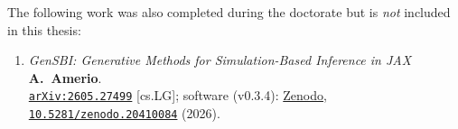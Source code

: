 \noindent The following work was also completed during the doctorate but is
\emph{not} included in this thesis:
%
\begin{enumerate}[resume]
	\item \emph{GenSBI: Generative Methods for Simulation-Based Inference in JAX}\\
	      \textbf{A.~Amerio}.\\
	      \href{https://arxiv.org/abs/2605.27499}{\tt arXiv:2605.27499} [cs.LG]; software (v0.3.4): \href{https://doi.org/10.5281/zenodo.20410084}{Zenodo, \texttt{10.5281/zenodo.20410084}} (2026).
\end{enumerate}
